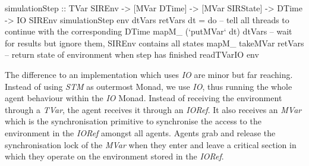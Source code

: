 \begin{HaskellCode}
simulationStep :: TVar SIREnv
               -> [MVar DTime]
               -> [MVar SIRState]
               -> DTime
               -> IO SIREnv
simulationStep env dtVars retVars dt = do
  -- tell all threads to continue with the corresponding DTime
  mapM_ (`putMVar` dt) dtVars
  -- wait for results but ignore them, SIREnv contains all states
  mapM_ takeMVar retVars
  -- return state of environment when step has finished
  readTVarIO env
\end{HaskellCode}

The difference to an implementation which uses \textit{IO} are minor but far reaching. Instead of using \textit{STM} as outermost Monad, we use \textit{IO}, thus running the whole agent behaviour within the \textit{IO} Monad. Instead of receiving the environment through a \textit{TVar}, the agent receives it through an \textit{IORef}. It also receives an \textit{MVar} which is the synchronisation primitive to synchronise the access to the environment in the \textit{IORef} amongst all agents. Agents grab and release the synchronisation lock of the \textit{MVar} when they enter and leave a critical section in which they operate on the environment stored in the \textit{IORef}.